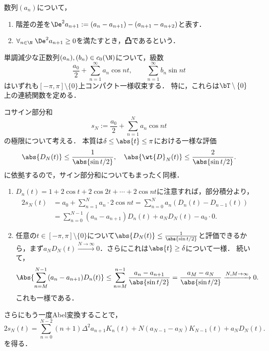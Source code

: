\documentclass[uplatex,dvipdfmx]{jsreport}
\begin{document}
\begin{notation}
    数列$(a_n)$について，
    \begin{enumerate}
        \item 階差の差を$\De^2 a_{n+1}:=(a_n-a_{n+1})-(a_{n+1}-a_{n+2})$と表す．
        \item $\forall_{n\in\N}\;\De^2a_{n+1}\ge0$を満たすとき，\textbf{凸}であるという．
    \end{enumerate}
\end{notation}

\begin{proposition}\label{prop-convergent-sine-series}
    単調減少な正数列$(a_n),(b_n)\in c_0(\N)$について，級数
    \[\frac{a_0}{2}+\sum_{n=1}^\infty a_n\cos nt,\qquad \sum_{n=1}^\infty b_n\sin nt\]
    はいずれも$[-\pi,\pi]\setminus\{0\}$上コンパクト一様収束する．
    特に，これらは$\bT\setminus\{0\}$上の連続関数を定める．
\end{proposition}
\begin{Proof}
    コサイン部分和
    \[s_N:=\frac{a_0}{2}+\sum_{n=1}^Na_n\cos nt\]
    の極限について考える．
    本質は$\delta\le\abs{t}\le\pi$における一様な評価
    \[\abs{D_N(t)}\le\frac{1}{\abs{\sin t/2}},\quad \abs{\wt{D}_N(t)}\le\frac{2}{\abs{\sin t/2}}.\]
    に依拠するので，サイン部分和についてもまったく同様．
    \begin{enumerate}[{Step}1]
        \item $D_n(t)=1+2\cos t+2\cos 2t+\cdots+2\cos nt$に注意すれば，部分積分より，
        \begin{align*}
            2s_N(t)&=a_0+\sum_{n=1}^Na_n\cdot 2\cos nt=\sum_{n=0}^Na_n(D_n(t)-D_{n-1}(t))\\
            &=\sum_{n=0}^{N-1}(a_n-a_{n+1})D_n(t)+a_ND_N(t)-a_0\cdot 0.
        \end{align*}
        \item 任意の$t\in[-\pi,\pi]\setminus\{0\}$について$\abs{D_N(t)}\le\frac{1}{\abs{\sin t/2}}$と評価できるから，まず$a_ND_N(t)\xrightarrow{N\to\infty}0$．さらにこれは$\abs{t}\ge\delta$について一様．
        続いて，
        \[\Abs{\sum_{n=M}^{N-1}(a_n-a_{n+1})D_n(t)}\le\sum_{n=M}^{n-1}\frac{a_n-a_{n+1}}{\abs{\sin t/2}}=\frac{a_M-a_N}{\abs{\sin t/2}}\xrightarrow{N,M\to\infty}0.\]
        これも一様である．
    \end{enumerate}
\end{Proof}
\begin{remarks}[凸数列への注目]\label{remarks-convex-sequence}
    さらにもう一度Abel変換することで，
    \[2s_N(t)=\sum_{n=0}^{N-2}(n+1)\Delta^2a_{n+1}K_n(t)+N(a_{N-1}-a_N)K_{N-1}(t)+a_ND_N(t).\]
    を得る．
\end{remarks}
\end{document}
